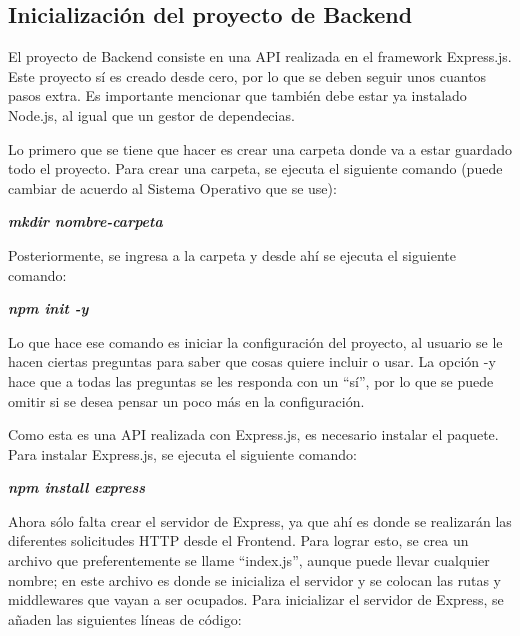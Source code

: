 \subsection{Inicialización del proyecto de Backend}
El proyecto de Backend consiste en una API realizada en el framework Express.js. Este proyecto sí es creado desde cero, por lo que se deben seguir unos cuantos pasos extra. Es importante mencionar que también debe estar ya instalado Node.js, al igual que un gestor de dependecias.

Lo primero que se tiene que hacer es crear una carpeta donde va a estar guardado todo el proyecto. Para crear una carpeta, se ejecuta el siguiente comando (puede cambiar de acuerdo al Sistema Operativo que se use):
    \begin{center}
        \textbf{
            \emph{
                mkdir nombre-carpeta
                }
            }
    \end{center}
Posteriormente, se ingresa a la carpeta y desde ahí se ejecuta el siguiente comando:
    \begin{center}
        \textbf{
            \emph{
                npm init -y
                }
            }
    \end{center}
Lo que hace ese comando es iniciar la configuración del proyecto, al usuario se le hacen ciertas preguntas para saber que cosas quiere incluir o usar. La opción -y hace que a todas las preguntas se les responda con un ``sí'', por lo que se puede omitir si se desea pensar un poco más en la configuración.

Como esta es una API realizada con Express.js, es necesario instalar el paquete. Para instalar Express.js, se ejecuta el siguiente comando:
    \begin{center}
        \textbf{
            \emph{
                npm install express
                }
            }
    \end{center}
Ahora sólo falta crear el servidor de Express, ya que ahí es donde se realizarán las diferentes solicitudes HTTP desde el Frontend. Para lograr esto, se crea un archivo que preferentemente se llame ``index.js'', aunque puede llevar cualquier nombre; en este archivo es donde se inicializa el servidor y se colocan las rutas y middlewares que vayan a ser ocupados. Para inicializar el servidor de Express, se añaden las siguientes líneas de código:

